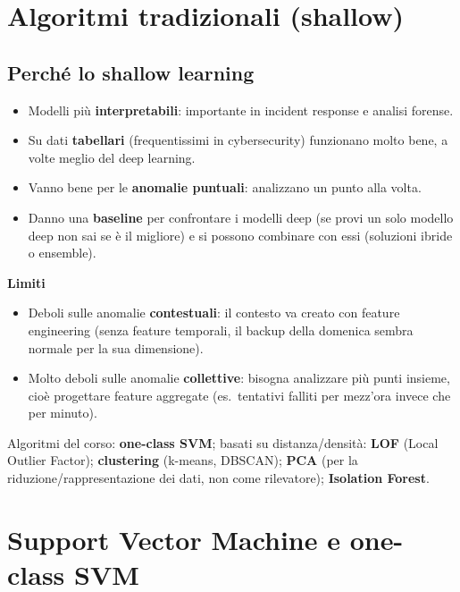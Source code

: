 \section{Algoritmi tradizionali (shallow)}
\subsection{Perché lo shallow learning}
\begin{itemize}
  \item Modelli più \textbf{interpretabili}: importante in incident response e analisi forense.
  \item Su dati \textbf{tabellari} (frequentissimi in cybersecurity) funzionano molto bene, a volte meglio del deep learning.
  \item Vanno bene per le \textbf{anomalie puntuali}: analizzano un punto alla volta.
  \item Danno una \textbf{baseline} per confrontare i modelli deep (se provi un solo modello deep non sai se è il migliore) e si possono
        combinare con essi (soluzioni ibride o ensemble).
\end{itemize}
\textbf{Limiti}
\begin{itemize}
  \item Deboli sulle anomalie \textbf{contestuali}: il contesto va creato con feature engineering (senza feature temporali, il backup della domenica
        sembra normale per la sua dimensione).
  \item Molto deboli sulle anomalie \textbf{collettive}: bisogna analizzare più punti insieme, cioè progettare feature aggregate (es.\ tentativi
        falliti per mezz'ora invece che per minuto).
\end{itemize}
Algoritmi del corso: \textbf{one-class SVM}; basati su distanza/densità: \textbf{LOF} (Local Outlier Factor); \textbf{clustering}
(k-means, DBSCAN); \textbf{PCA} (per la riduzione/rappresentazione dei dati, non come rilevatore); \textbf{Isolation Forest}.

\section{Support Vector Machine e one-class SVM}
